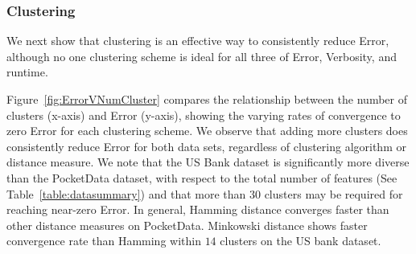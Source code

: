 \subsubsection{Clustering}
\label{sec:clustering}
We next show that clustering is an effective way to consistently reduce Error, although no one clustering scheme is ideal for all three of Error, Verbosity, and runtime.

Figure~\ref{fig:ErrorVNumCluster} compares the relationship between the number of clusters (x-axis) and Error (y-axis), showing the varying rates of convergence to zero Error for each clustering scheme.
We observe that adding more clusters does consistently reduce Error for both data sets, regardless of clustering algorithm or distance measure.
We note that the US Bank dataset is significantly more diverse than the PocketData dataset, with respect to the total number of features (See Table~\ref{table:datasummary}) and that more than $30$ clusters may be required for reaching near-zero Error.
In general, Hamming distance converges faster than other distance measures on PocketData.
Minkowski distance shows faster convergence rate than Hamming within $14$ clusters on the US bank dataset. 

